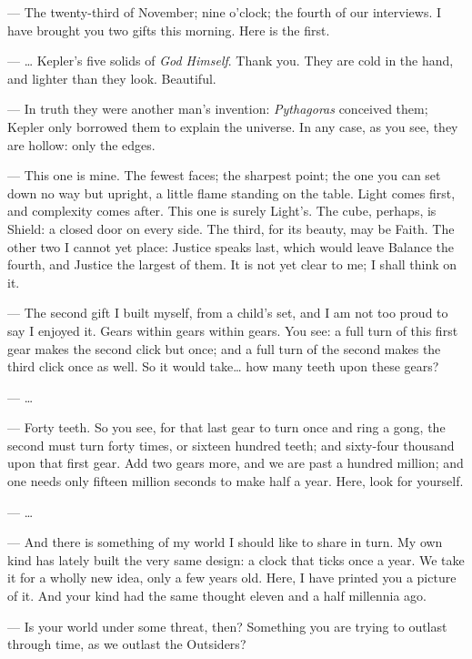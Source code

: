 
\begin{room}

--- The twenty-third of November; nine o'clock; the fourth of our interviews. I have brought you two gifts this morning. Here is the first. 

--- \ldots{} Kepler's five solids of \textit{God Himself}. Thank you. They are cold in the hand, and lighter than they look. Beautiful.

--- In truth they were another man's invention: \textit{Pythagoras} conceived them; Kepler only borrowed them to explain the universe. In any case, as you see, they are hollow: only the edges.

--- This one is mine. The fewest faces; the sharpest point; the one you can set down no way but upright, a little flame standing on the table. Light comes first, and complexity comes after. This one is surely Light's. The cube, perhaps, is Shield: a closed door on every side. The third, for its beauty, may be Faith. The other two I cannot yet place: Justice speaks last, which would leave Balance the fourth, and Justice the largest of them. It is not yet clear to me; I shall think on it.

--- The second gift I built myself, from a child's set, and I am not too proud to say I enjoyed it. Gears within gears within gears. You see: a full turn of this first gear makes the second click but once; and a full turn of the second makes the third click once as well. So it would take\ldots{} how many teeth upon these gears?

--- \ldots{}

--- Forty teeth. So you see, for that last gear to turn once and ring a gong, the second must turn forty times, or sixteen hundred teeth; and sixty-four thousand upon that first gear. Add two gears more, and we are past a hundred million; and one needs only fifteen million seconds to make half a year. Here, look for yourself.

--- \ldots{}

--- And there is something of my world I should like to share in turn. My own kind has lately built the very same design: a clock that ticks once a year. We take it for a wholly new idea, only a few years old. Here, I have printed you a picture of it. And your kind had the same thought eleven and a half millennia ago.

--- Is your world under some threat, then? Something you are trying to outlast through time, as we outlast the Outsiders?


\end{room}

